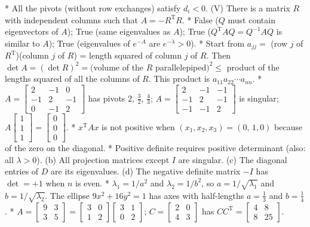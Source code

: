 
* All the pivots (without row exchanges) satisfy \(d_{i}<0\). (V) There is a matrix \(R\) with independent columns such that \(A=-R^{\mathrm{T}}R\).
* False (\(Q\) must contain eigenvectors of \(A\)); True (same eigenvalues as \(A\)); True (\(Q^{\mathrm{T}}AQ=Q^{-1}AQ\) is similar to \(A\)); True (eigenvalues of \(e^{-A}\) are \(e^{-\lambda}>0\)).
* Start from \(a_{jj}=\) (row \(j\) of \(R^{\mathrm{T}}\))(column \(j\) of \(R\)) = length squared of column \(j\) of \(R\). Then \(\det A=(\det R)^{2}=(\)volume of the \(R\) parallelepiped\()^{2}\leq\) product of the lengths squared of all the columns of \(R\). This product is \(a_{11}a_{22}\cdots a_{nn}\).
* \(A=\begin{bmatrix}2&-1&0\\ -1&2&-1\\ 0&-1&2\end{bmatrix}\) has pivots \(2\), \(\frac{3}{2}\), \(\frac{4}{3}\); \(A=\begin{bmatrix}2&-1&-1\\ -1&2&-1\\ -1&-1&2\end{bmatrix}\) is singular; \(A\begin{bmatrix}1\\ 1\\ 1\end{bmatrix}=\begin{bmatrix}0\\ 0\\ 0\end{bmatrix}\).
* \(x^{\mathrm{T}}Ax\) is not positive when \((x_{1},x_{2},x_{3})=(0,\,1,0)\) because of the zero on the diagonal.
* Positive definite requires positive determinant (also: all \(\lambda>0\)). (b) All projection matrices except \(I\) are singular. (c) The diagonal entries of \(D\) are its eigenvalues. (d) The negative definite matrix \(-I\) has \(\det=+1\) when \(n\) is even.
* \(\lambda_{1}=1/a^{2}\) and \(\lambda_{2}=1/b^{2}\), so \(a=1/\sqrt{\lambda_{1}}\) and \(b=1/\sqrt{\lambda_{2}}\). The ellipse \(9x^{2}+16y^{2}=1\) has axes with half-lengths \(a=\frac{1}{3}\) and \(b=\frac{1}{4}\).
* \(A=\begin{bmatrix}9&3\\ 3&5\end{bmatrix}=\begin{bmatrix}3&0\\ 1&2\end{bmatrix}\begin{bmatrix}3&1\\ 0&2\end{bmatrix}\); \(C=\begin{bmatrix}2&0\\ 4&3\end{bmatrix}\) has \(CC^{\mathrm{T}}=\begin{bmatrix}4&8\\ 8&25\end{bmatrix}\).
